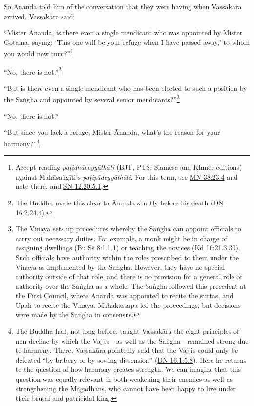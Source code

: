 \documentclass[12pt,openany]{book}%
\begin{document}
So Ānanda told him of the conversation that they were having when \textsanskrit{Vassakāra} arrived. \textsanskrit{Vassakāra} said: 

“Mister Ānanda, is there even a single mendicant who was appointed by Mister Gotama, saying: ‘This one will be your refuge when I have passed away,’ to whom you would now turn?”\footnote{Accept reading \textit{\textsanskrit{paṭidhāveyyāthāti}} (BJT, PTS, Siamese and Khmer editions) against \textsanskrit{Mahāsaṅgīti}’s \textit{\textsanskrit{paṭipādeyyāthāti}}. For this term, see \href{https://suttacentral.net/mn38/en/sujato\#23.4}{MN 38:23.4} and note there, and \href{https://suttacentral.net/sn12.20/en/sujato\#5.1}{SN 12.20:5.1}. } 

“No, there is not.”\footnote{The Buddha made this clear to Ānanda shortly before his death (\href{https://suttacentral.net/dn16/en/sujato\#2.24.4}{DN 16:2.24.4}). } 

“But is there even a single mendicant who has been elected to such a position by the \textsanskrit{Saṅgha} and appointed by several senior mendicants?”\footnote{The Vinaya sets up procedures whereby the \textsanskrit{Saṅgha} can appoint officials to carry out necessary duties. For example, a monk might be in charge of assigning dwellings (\href{https://suttacentral.net/pli-tv-bu-vb-ss8/en/sujato\#1.1.1}{Bu Ss 8:1.1.1}) or teaching the novices (\href{https://suttacentral.net/pli-tv-kd16/en/sujato\#21.3.30}{Kd 16:21.3.30}). Such officials have authority within the roles prescribed to them under the Vinaya as implemented by the \textsanskrit{Saṅgha}. However, they have no special authority outside of that role, and there is no provision for a general role of authority over the \textsanskrit{Saṅgha} as a whole. The \textsanskrit{Saṅgha} followed this precedent at the First Council, where Ānanda was appointed to recite the suttas, and \textsanskrit{Upāli} to recite the Vinaya. \textsanskrit{Mahākassapa} led the proceedings, but decisions were made by the \textsanskrit{Saṅgha} in consensus. } 

“No, there is not.” 

“But since you lack a refuge, Mister Ānanda, what’s the reason for your harmony?”\footnote{The Buddha had, not long before, taught \textsanskrit{Vassakāra} the eight principles of non-decline by which the Vajjis—as well as the \textsanskrit{Saṅgha}—remained strong due to harmony. There, \textsanskrit{Vassakāra} pointedly said that the Vajjis could only be defeated “by bribery or by sowing dissension” (\href{https://suttacentral.net/dn16/en/sujato\#1.5.8}{DN 16:1.5.8}). Here he returns to the question of how harmony creates strength. We can imagine that this question was equally relevant in both weakening their enemies as well as strengthening the Magadhans, who cannot have been happy to live under their brutal and patricidal king. } 
\end{document}
